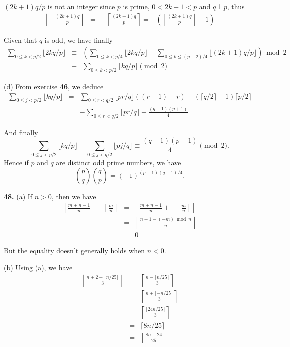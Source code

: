 \documentclass[a4paper,12pt]{article}
\newcommand{\newpar}[1]{\bigskip \noindent \textbf{#1.}}
\newcommand{\subpar}[1]{\medskip \noindent (#1)}
\begin{document}
$(2k+1)q/p$ is not an integer since $p$ is prime, $0 < 2k+1 < p$ and
$q\,\bot\,p$, thus
\begin{eqnarray*}
  \left\lfloor -\frac{(2k+1)q}{p}\right\rfloor &=&
  - \left\lceil \frac{(2k+1)q}{p}\right\rceil =
  - \left( \left\lfloor \frac{(2k+1)q}{p}\right\rfloor + 1\right)
\end{eqnarray*}

Given that $q$ is odd, we have finally
\begin{eqnarray*}
  \sum_{0\le k<p/2}\lfloor 2kq/p\rfloor &\equiv& \left(
  \sum_{0\le k<p/4} \lfloor 2kq/p\rfloor +
  \sum_{0\le k\le (p-2)/4} \lfloor (2k+1)q/p\rfloor \right) \bmod 2 \\
  &\equiv& \sum_{0\le k <p/2} \lfloor kq/p\rfloor \pmod 2
\end{eqnarray*}

\subpar{d} From exercise \textbf{46}, we deduce
\begin{eqnarray*}
  \sum_{0\le j<p/2} \lfloor kq/p\rfloor &=&
  \sum_{0\le r<q/2} \lfloor pr/q \rfloor ((r-1) - r) +
  (\lceil q/2\rceil - 1) \lceil p/2\rceil \\
  &=& - \sum_{0\le r<q/2} \lfloor pr/q\rfloor + \frac{(q-1)(p+1)}{4}
\end{eqnarray*}

And finally
\[ \sum_{0\le j<p/2} \lfloor kq/p\rfloor + \sum_{0\le j<q/2} \lfloor
pj/q\rfloor \equiv \frac{(q-1)(p-1)}{4} \pmod 2.\]
Hence if $p$ and $q$ are distinct odd prime numbers, we have
\[ \left(\frac{p}{q}\right) \left(\frac{q}{p}\right) =
(-1)^{(p-1)(q-1)/4}.\]

\newpar{48} \subpar{a} If $n>0$, then we have
\begin{eqnarray*}
  \left\lfloor \frac{m+n-1}{n} \right\rfloor - \left\lceil
  \frac{m}{n}\right\rceil &=& \left\lfloor
  \frac{m+n-1}{n} + \left\lfloor -\frac{m}{n}\right\rfloor
  \right\rfloor \\
  &=& \left\lfloor \frac{n-1 - (-m) \bmod n}{n} \right\rfloor \\
  &=& 0
\end{eqnarray*}

But the equality doesn't generally holds when $n<0$.

\subpar{b} Using (a), we have
\begin{eqnarray*}
  \left\lfloor \frac{n+2-\lfloor n/25\rfloor}{3}\right\rfloor &=&
  \left\lceil \frac{n - \lfloor n/25\rfloor}{3}\right\rceil \\
  &=& \left\lceil \frac{n + \lceil -n/25\rceil}{3}\right\rceil \\
  &=& \left\lceil \frac{\lceil 24n/25\rceil}{3}\right\rceil \\
  &=& \lceil 8n/25\rceil \\
  &=& \left\lfloor \frac{8n+24}{25}\right\rfloor
\end{eqnarray*}
\end{document}
